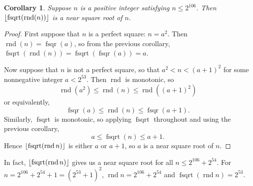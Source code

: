 \documentclass[a4paper]{article}
\DeclarePairedDelimiter\floor{\lfloor}{\rfloor}
\DeclareMathOperator{\rnd}{rnd}
\DeclareMathOperator{\fsqrt}{fsqrt}
\DeclareMathOperator{\fsqr}{fsqr}
\theoremstyle{plain}
\newtheorem{corollary}[theorem]{Corollary}
\theoremstyle{definition}
\begin{document}
\begin{corollary}
  Suppose $n$ is a positive integer satisfying $n \le 2^{106}$. Then
  $\floor{\fsqrt(\rnd(n))}$ is a near square root of $n$.
\end{corollary}

\begin{proof}
  First suppose that $n$ is a perfect square: $n = a^2$. Then $\rnd(n) =
  \fsqr(a)$, so from the previous corollary, $\fsqrt(\rnd(n)) =
  \fsqrt(\fsqr(a)) = a$.

  Now suppose that $n$ is not a perfect square, so that $a^2 < n < (a+1)^2$
  for some nonnegative integer $a < 2^{53}$. Then $\rnd$ is monotonic, so
    $$\rnd(a^2) \le \rnd(n) \le \rnd((a+1)^2)$$
  or equivalently,
    $$\fsqr(a) \le \rnd(n) \le \fsqr(a+1).$$
  Similarly, $\fsqrt$ is monotonic, so applying $\fsqrt$ throughout
  and using the previous corollary,
    $$a \le \fsqrt(n) \le a + 1.$$
  Hence $\floor{\fsqrt(\rnd n)}$ is either $a$ or $a+1$, so $a$ is a near
  square root of $n$.
\end{proof}

In fact, $\floor{\fsqrt(\rnd n)}$ gives us a near square root for all
$n \le 2^{106} + 2^{54}$. For $n = 2^{106} + 2^{54} + 1 = (2^{53} + 1)^2$,
$\rnd n = 2^{106} + 2^{54}$ and $\fsqrt(\rnd n) = 2^{53}$.


\end{document}
